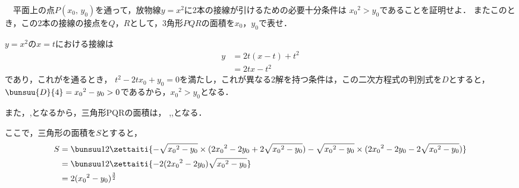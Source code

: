\begin{problem}
　平面上の点$P(x_0, \, y_0)$を通って，放物線$y=x^2$に2本の接線が引けるための必要十分条件は
${x_0}^2>y_0$であることを証明せよ．
またこのとき，この2本の接線の接点を$Q$，$R$として，3角形$PQR$の面積を$x_0$，$y_0$で表せ．
\end{problem}



$y = x^2$の$x=t$における接線は
\begin{align*}
  y &= 2t(x-t) + t^2 \\
  &= 2tx - t^2
\end{align*}
であり，これがを通るとき，
$t^2 - 2tx_0 + y_0 = 0$を満たし，これが異なる2解を持つ条件は，この二次方程式の判別式を$D$とすると，
$\bunsuu{D}{4} = {x_0}^2 - y_0 >0$であるから，${x_0}^2 > y_0$となる．

また，,となるから，三角形PQRの面積は，
,,となる．

ここで，三角形の面積を$S$とすると，
\begin{align*}
  S &= \bunsuu12 \zettaiti{-\sqrt{{x_0}^2-y_0}\times (2{x_0}^2-2y_0+2\sqrt{{x_0}^2-y_0}) - \sqrt{{x_0}^2-y_0} \times
  (2{x_0}^2-2y_0-2\sqrt{{x_0}^2-y_0})} \\
  &= \bunsuu12 \zettaiti{-2(2{x_0}^2-2y_0) \sqrt{{x_0}^2-y_0}} \\
  &= 2 ({x_0}^2 - y_0)^{\frac32}
\end{align*}

